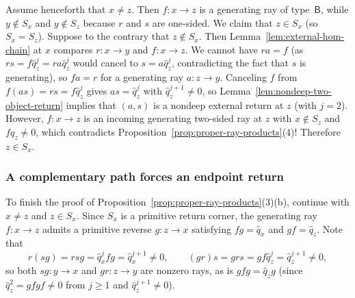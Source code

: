 Assume henceforth that $x\ne z$. Then $f\colon x\to z$ is a generating ray of type~$\mathsf B$, while $y\notin S_x$ and $y\notin S_z$ because $r$ and $s$ are one-sided. We claim that $z\in S_x$ (so $S_x=S_z$). Suppose to the contrary that $z\notin S_x$. Then Lemma~\ref{lem:external-hom-chain} at $x$ compares $r\colon x\to y$ and $f\colon x\to z$. We cannot have $ra=f$ (as $rs=f\widehat q_z^j=ra\widehat q_z^j$ would cancel to $s=a\widehat q_z^j$, contradicting the fact that $s$ is generating), so $fa=r$ for a generating ray $a\colon z\to y$. Canceling $f$ from $f(as)=rs=f\widehat q_z^j$ gives $as=\widehat q_z^j$ with $\widehat q_z^{j+1}\ne0$, so Lemma~\ref{lem:nondeep-two-object-return} implies that $(a,s)$ is a nondeep external return at $z$ (with $j=2$). However, $f\colon x\to z$ is an incoming generating two-sided ray at $z$ with $x\notin S_z$ and $f\widehat q_z\ne0$, which contradicts Proposition~\ref{prop:proper-ray-products}(4)! Therefore $z\in S_x$.

\subsubsection{A complementary path forces an endpoint return}

To finish the proof of Proposition~\ref{prop:proper-ray-products}(3)(b), continue with $x\ne z$ and $z\in S_x$. Since $S_x$ is a primitive return corner, the generating ray $f\colon x\to z$ admits a primitive reverse $g\colon z\to x$ satisfying $fg=\widehat q_x$ and $gf=\widehat q_z$. Note that
\begin{equation}
  r(sg)=rsg=\widehat q_x^jfg=\widehat q_x^{j+1}\ne0,\qquad
  (gr)s=grs=gf\widehat q_z^j=\widehat q_z^{j+1}\ne0,
  \label{eq:complementary-closing-products}
\end{equation}
so both $sg\colon y\to x$ and $gr\colon z\to y$ are nonzero rays, as is $gfg=\widehat q_zg$ (since $\widehat q_z^2=gfgf\ne0$ from $j\geq1$ and $\widehat q_z^{j+1}\ne0$).

